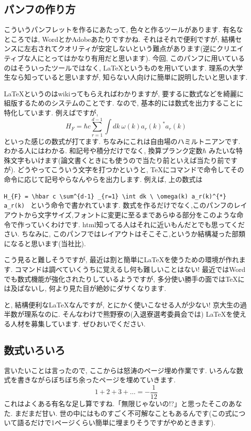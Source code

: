 \documentclass[10pt,b5jsbook,dvips,dvipdfmx,openany]{jsbook}
\theoremstyle{definition}
\begin{document}
     \subsection{パンフの作り方}
		   こういうパンフレットを作るにあたって, 色々と作るツールがあります. 有名なところでは, WordとかAdobeあたりですかね. それはそれで便利ですが, 結構センスに左右されてクオリティが安定しないという難点があります(逆にクリエイティブな人にとってはかなり有用だと思います). 今回, このパンフに用いているのはそういったツールではなく, \LaTeX というものを用いています. 理系の大学生なら知っていると思いますが, 知らない人向けに簡単に説明したいと思います.

       \LaTeX というのはwikiってもらえればわかりますが, 要するに数式などを綺麗に組版するためのシステムのことです. なので, 基本的には数式を出力することに特化しています. 例えばですが,
       \[
 	 	   H_{F} = \hbar c \sum^{d-1} _{r=1} \int dk \ \omega(k) a_r(k)^{*} a_r(k)
       \]
       といった感じの数式が打てます. ちなみにこれは自由場のハミルトニアンです. わかる人にはわかる. 和記号や積分だけでなく, 換算プランク定数$ \hbar $ みたいな特殊文字もいけます(論文書くときにも使うので当たり前といえば当たり前ですが). どうやってこういう文字を打つかというと, \TeX にコマンドで命令してその命令に応じて記号やらなんやらを出力します. 例えば, 上の数式は

       \verb|H_{F} = \hbar c \sum^{d-1} _{r=1} \int dk \ \omega(k) a_r(k)^{*} a_r(k) |
       という命令で書かれています. 数式を作るだけでなく,このパンフのレイアウトから文字サイズ,フォントに変更に至るまであらゆる部分をこのような命令で作っていくわけです. html知ってる人はそれに近いもんだとでも思ってください. ちなみに, このパンフではレイアウトはそこそこ,というか結構凝った部類になると思います(当社比).

		こう見ると難しそうですが, 最近は割と簡単に\LaTeX を使うための環境が作れます. コマンドは調べていくうちに覚えるし何も難しいことはない! 最近ではWordでも数式機能が強化されたりしているようですが, 多分使い勝手の面では\TeX には及ばないし, 何より見た目が絶妙にダサくなります.

		と, 結構便利な\LaTeX なんですが, とにかく使いこなせる人が少ない! 京大生の過半数が理系なのに. そんなわけで熊野寮の(入退寮選考委員会では) \LaTeX を使える人材を募集しています. ぜひおいでください.

		\subsection{数式いろいろ}
		言いたいことは言ったので, ここからは怒涛のページ埋め作業です. いろんな数式を書きながらぼちぼち余ったページを埋めていきます.
		\[
      	1+2+3+\dots = - \frac{1}{12}
    \]
		これはよくある有名な足し算ですね.「無限じゃないの!?」と思ったそこのあなた. まだまだ甘い. 世の中にはものすごく不可解なこともあるんです(この式について語るだけで1ページくらい簡単に埋まりそうですがやめときます).
\end{document}
